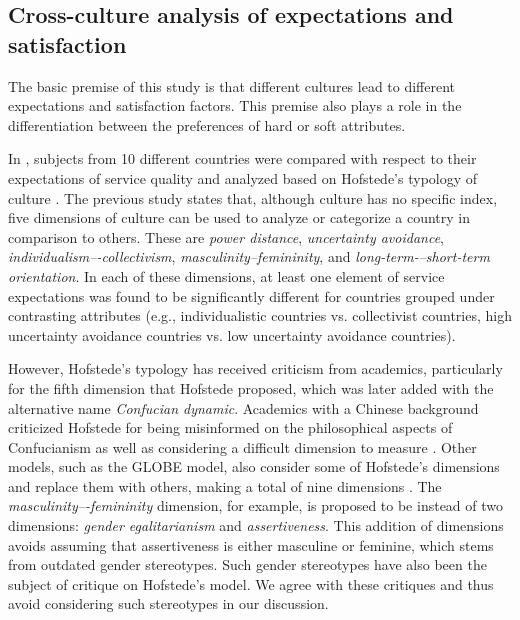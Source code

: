 \documentclass[smallextended,natbib]{svjour3}       %
\begin{document}
  \subsection{Cross-culture analysis of expectations and satisfaction}\label{disc:culture}

    The basic premise of this study is that different cultures lead to different expectations and satisfaction factors. This premise also plays a role in the differentiation between the preferences of hard or soft attributes.

    In \cite{donthu1998cultural}, subjects from 10 different countries were compared with respect to their expectations of service quality and analyzed based on Hofstede's typology of culture \cite[][]{hofstede1984culture}. The previous study states that, although culture has no specific index, five dimensions of culture can be used to analyze or categorize a country in comparison to others. These are \textit{power distance}, \textit{uncertainty avoidance}, \textit{individualism–-collectivism}, \textit{masculinity–femininity}, and \textit{long-term-–short-term orientation}. In each of these dimensions, at least one element of service expectations was found to be significantly different for countries grouped under contrasting attributes (e.g., individualistic countries vs. collectivist countries, high uncertainty avoidance countries vs. low uncertainty avoidance countries). 

    However, Hofstede's typology has received criticism from academics, particularly for the fifth dimension that Hofstede proposed, which was later added with the alternative name \textit{Confucian dynamic}. Academics with a Chinese background criticized Hofstede for being misinformed on the philosophical aspects of Confucianism as well as considering a difficult dimension to measure \cite[][]{fang2003critique}. Other models, such as the GLOBE model, also consider some of Hofstede's dimensions and replace them with others, making a total of nine dimensions \cite[][]{house1999cultural}. The \textit{masculinity–-femininity} dimension, for example, is proposed to be instead of two dimensions: \textit{gender egalitarianism} and \textit{assertiveness}. This addition of dimensions avoids assuming that assertiveness is either masculine or feminine, which stems from outdated gender stereotypes. Such gender stereotypes have also been the subject of critique on Hofstede's model\cite[][]{jeknic2014gender}. We agree with these critiques and thus avoid considering such stereotypes in our discussion.
\end{document}
